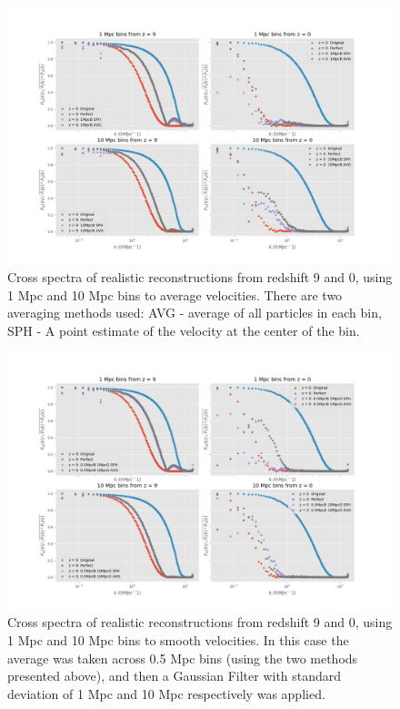 \begin{figure}
    \centering
    \includegraphics[width=1\columnwidth]{images/crossSpectra/Spec_5_norm.png}%
    
    \caption{
    Cross spectra of realistic reconstructions from redshift 9 and 0, using 1 Mpc and 10 Mpc bins to average velocities. There are two averaging methods used: AVG - average of all particles in each bin, SPH - A point estimate of the velocity at the center of the bin.  
    }
    
    \label{fig:8}
\end{figure}

\begin{figure}
    \centering
    \includegraphics[width=1\columnwidth]{images/crossSpectra/Spec_6_filt.png}%
    
    \caption{
        Cross spectra of realistic reconstructions from redshift 9 and 0, using 1 Mpc and 10 Mpc bins to smooth velocities. In this case the average was taken across 0.5 Mpc bins (using the two methods presented above), and then a Gaussian Filter with standard deviation of 1 Mpc and 10 Mpc respectively was applied.
    }
    
    \label{fig:9}
\end{figure}


